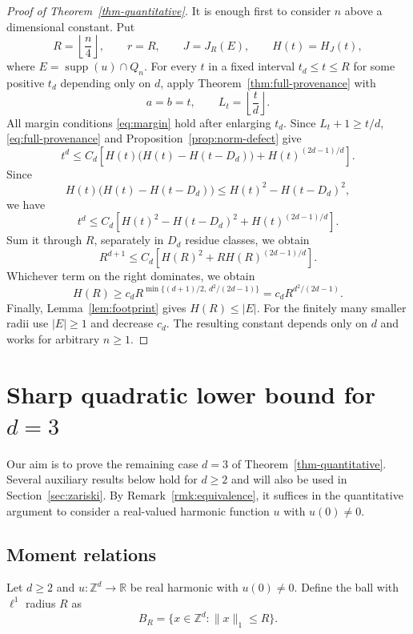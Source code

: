 \documentclass[11pt,reqno]{amsart}
\newcommand\R{\ensuremath{\mathbb{R}}}
\newcommand\Z{\ensuremath{\mathbb{Z}}}
\newcommand{\supp}{\operatorname{supp}}
\theoremstyle{definition}
\theoremstyle{plain}
\numberwithin{equation}{section}
\begin{document}
\begin{proof}[Proof of Theorem~\ref{thm-quantitative}]
It is enough first to consider $n$ above a dimensional constant.  Put
\[
 R=\left\lfloor\frac{n}{4}\right\rfloor,
 \qquad r=R,
 \qquad J=J_R(E),
 \qquad H(t)=H_J(t),
\]
where $E=\supp(u)\cap Q_n$.  For every $t$ in a fixed 
interval $t_d\le t\le R$ for some positive $t_d$ depending only on $d$, apply
Theorem~\ref{thm:full-provenance} with
\[
 a=b=t,\qquad L_t=\left\lfloor\frac{t}{d}\right\rfloor.
\]
All margin conditions \eqref{eq:margin} hold after enlarging $t_d$.  Since $L_t+1\ge t/d$,
\eqref{eq:full-provenance}
and Proposition~\ref{prop:norm-defect} give
\begin{equation*}
 t^d\le C_d\left[
 H(t)\bigl(H(t)-H(t-D_d)\bigr)
       +H(t)^{(2d-1)/d}\right].
\end{equation*}
Since
\[
 H(t)\bigl(H(t)-H(t-D_d)\bigr)
 \le H(t)^2-H(t-D_d)^2,
\]
we have
\begin{equation*}
    t^d\le C_d\left[
 H(t)^2-H(t-D_d)^2
       +H(t)^{(2d-1)/d}\right].
\end{equation*}
Sum it through $R$, separately in $D_d$ residue classes, we obtain
\begin{equation*}
 R^{d+1}\le C_d\left[
       H(R)^2+R H(R)^{(2d-1)/d}\right].
\end{equation*}
Whichever term on the right dominates, we obtain
\[
 H(R)\ge c_dR^{\min\{(d+1)/2,\,d^2/(2d-1)\}}
       =c_dR^{d^2/(2d-1)}.
\]
Finally,
Lemma~\ref{lem:footprint} gives $H(R)\le|E|$.  For the finitely many
smaller radii use $|E|\ge1$ and decrease $c_d$.  The resulting constant
depends only on $d$ and works for arbitrary $n\ge1$.
\end{proof}



\section{Sharp quadratic lower bound for \texorpdfstring{$d=3$}{}}\label{sec:proof-sharp-3}

Our aim is to prove the remaining case $d=3$ of
Theorem~\ref{thm-quantitative}. Several auxiliary results below hold
for $d\geq2$ and will also be used in Section~\ref{sec:zariski}. By
Remark~\ref{rmk:equivalence}, it suffices in the quantitative argument
to consider a real-valued harmonic function $u$ with $u(0)\neq0$.  


\subsection{Moment relations}
Let $d\ge 2$ and $u:\Z^d\to \R$ be real harmonic with $u(0)\neq 0$. Define the ball with $\ell^1$ radius $R$ as
\begin{equation*}
    B_R=\lbrace x\in \Z^d: \|x\|_1\le R\rbrace.
\end{equation*}
\end{document}
